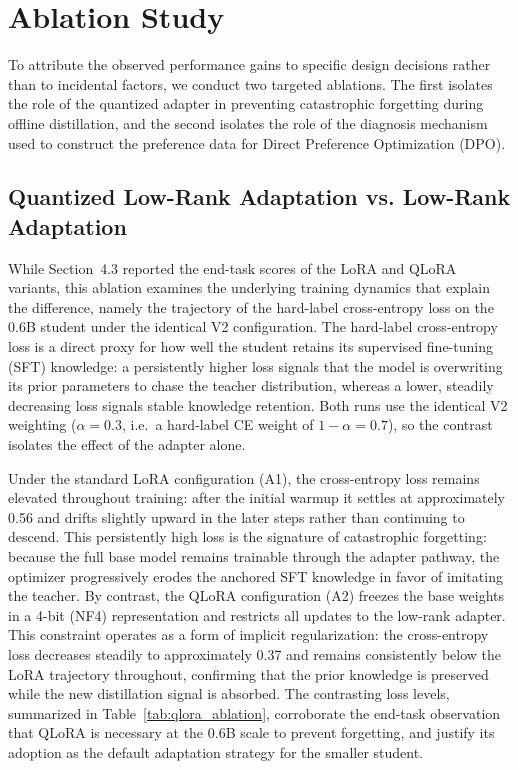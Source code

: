 \section{Ablation Study}

To attribute the observed performance gains to specific design decisions rather than to incidental factors, we conduct two targeted ablations. The first isolates the role of the quantized adapter in preventing catastrophic forgetting during offline distillation, and the second isolates the role of the diagnosis mechanism used to construct the preference data for Direct Preference Optimization (DPO).

\subsection{Quantized Low-Rank Adaptation vs. Low-Rank Adaptation}

While Section~4.3 reported the end-task scores of the LoRA and QLoRA variants, this ablation examines the underlying training dynamics that explain the difference, namely the trajectory of the hard-label cross-entropy loss on the 0.6B student under the identical V2 configuration. The hard-label cross-entropy loss is a direct proxy for how well the student retains its supervised fine-tuning (SFT) knowledge: a persistently higher loss signals that the model is overwriting its prior parameters to chase the teacher distribution, whereas a lower, steadily decreasing loss signals stable knowledge retention. Both runs use the identical V2 weighting ($\alpha=0.3$, i.e.\ a hard-label CE weight of $1-\alpha=0.7$), so the contrast isolates the effect of the adapter alone.

Under the standard LoRA configuration (A1), the cross-entropy loss remains elevated throughout training: after the initial warmup it settles at approximately 0.56 and drifts slightly upward in the later steps rather than continuing to descend. This persistently high loss is the signature of catastrophic forgetting: because the full base model remains trainable through the adapter pathway, the optimizer progressively erodes the anchored SFT knowledge in favor of imitating the teacher. By contrast, the QLoRA configuration (A2) freezes the base weights in a 4-bit (NF4) representation and restricts all updates to the low-rank adapter. This constraint operates as a form of implicit regularization: the cross-entropy loss decreases steadily to approximately 0.37 and remains consistently below the LoRA trajectory throughout, confirming that the prior knowledge is preserved while the new distillation signal is absorbed. The contrasting loss levels, summarized in Table~\ref{tab:qlora_ablation}, corroborate the end-task observation that QLoRA is necessary at the 0.6B scale to prevent forgetting, and justify its adoption as the default adaptation strategy for the smaller student.

